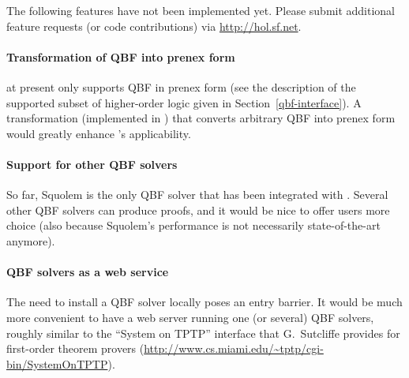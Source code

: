 The following features have not been implemented yet.  Please submit
additional feature requests (or code contributions) via
\url{http://hol.sf.net}.

\paragraph{Transformation of QBF into prenex form}

 at present only supports QBF in prenex form (see the
description of the supported subset of higher-order logic given in
Section~\ref{qbf-interface}).  A transformation (implemented in \HOL)
that converts arbitrary QBF into prenex form would greatly enhance
's applicability.

\paragraph{Support for other QBF solvers}

So far, Squolem is the only QBF solver that has been integrated with
\HOL.  Several other QBF solvers can produce proofs, and it would be
nice to offer \HOL{} users more choice (also because Squolem's
performance is not necessarily state-of-the-art anymore).

\paragraph{QBF solvers as a web service}

The need to install a QBF solver locally poses an entry barrier.  It
would be much more convenient to have a web server running one (or
several) QBF solvers, roughly similar to the ``System on TPTP''
interface that G.~Sutcliffe provides for first-order theorem provers
(\url{http://www.cs.miami.edu/~tptp/cgi-bin/SystemOnTPTP}).


